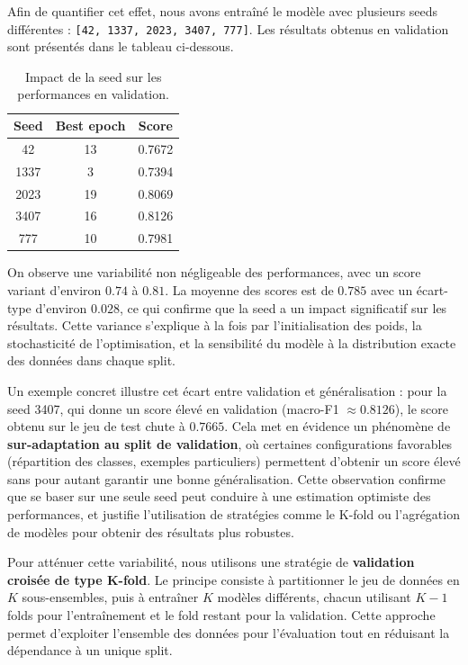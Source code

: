 \documentclass[journal,twocolumn]{IEEEtran}
\begin{document}
Afin de quantifier cet effet, nous avons entraîné le modèle avec plusieurs seeds différentes :
\texttt{[42, 1337, 2023, 3407, 777]}. Les résultats obtenus en validation sont présentés dans le tableau ci-dessous.

\begin{table}[h]
\centering
\caption{Impact de la seed sur les performances en validation.}
\begin{tabular}{|c|c|c|}
\hline
\textbf{Seed} & \textbf{Best epoch} & \textbf{Score} \\
\hline
42   & 13 & 0.7672 \\
1337 & 3  & 0.7394 \\
2023 & 19 & 0.8069 \\
3407 & 16 & 0.8126 \\
777  & 10 & 0.7981 \\
\hline
\end{tabular}
\end{table}


On observe une variabilité non négligeable des performances, avec un score variant d’environ $0.74$ à $0.81$. La moyenne des scores est de $0.785$ avec un écart-type d’environ $0.028$, ce qui confirme que la seed a un impact significatif sur les résultats. Cette variance s’explique à la fois par l’initialisation des poids, la stochasticité de l’optimisation, et la sensibilité du modèle à la distribution exacte des données dans chaque split.

\medskip

Un exemple concret illustre cet écart entre validation et généralisation : pour la seed 3407, qui donne un score élevé en validation (macro-F1 $\approx 0.8126$), le score obtenu sur le jeu de test chute à $0.7665$. Cela met en évidence un phénomène de \textbf{sur-adaptation au split de validation}, où certaines configurations favorables (répartition des classes, exemples particuliers) permettent d’obtenir un score élevé sans pour autant garantir une bonne généralisation. Cette observation confirme que se baser sur une seule seed peut conduire à une estimation optimiste des performances, et justifie l’utilisation de stratégies comme le K-fold ou l’agrégation de modèles pour obtenir des résultats plus robustes.

Pour atténuer cette variabilité, nous utilisons une stratégie de \textbf{validation croisée de type K-fold}. Le principe consiste à partitionner le jeu de données en $K$ sous-ensembles, puis à entraîner $K$ modèles différents, chacun utilisant $K-1$ folds pour l’entraînement et le fold restant pour la validation. Cette approche permet d’exploiter l’ensemble des données pour l’évaluation tout en réduisant la dépendance à un unique split.
\end{document}

